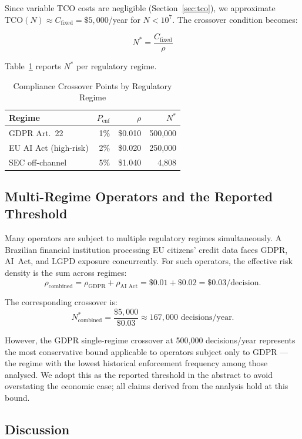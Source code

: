 Since variable TCO costs are negligible (Section~\ref{sec:tco}), we
approximate $\text{TCO}(N) \approx C_{\text{fixed}} = \$5{,}000$/year
for $N < 10^7$. The crossover condition becomes:

\[
  N^* = \frac{C_{\text{fixed}}}{\rho}
\]

Table~\ref{tab:crossover} reports $N^*$ per regulatory regime.

\begin{table}[h]
\centering
\caption{Compliance Crossover Points by Regulatory Regime}
\label{tab:crossover}
\begin{tabular}{lrrr}
\toprule
\textbf{Regime} & $P_{\text{enf}}$ & $\rho$ & $N^*$ \\
\midrule
GDPR Art.~22           & 1\%  & \$0.010  & 500{,}000 \\
EU AI Act (high-risk)  & 2\%  & \$0.020  & 250{,}000 \\
SEC off-channel        & 5\%  & \$1.040  & 4{,}808   \\
\bottomrule
\end{tabular}
\end{table}

\subsection{Multi-Regime Operators and the Reported Threshold}
\label{subsec:multiregime}

Many operators are subject to multiple regulatory regimes
simultaneously. A Brazilian financial institution processing EU
citizens' credit data faces GDPR, AI~Act, and LGPD exposure
concurrently. For such operators, the effective risk density is the
sum across regimes:
\[
  \rho_{\text{combined}} = \rho_{\text{GDPR}} + \rho_{\text{AI Act}}
  = \$0.01 + \$0.02 = \$0.03\text{/decision}.
\]

The corresponding crossover is:
\[
  N^*_{\text{combined}} = \frac{\$5{,}000}{\$0.03} \approx 167{,}000
  \text{ decisions/year.}
\]

However, the GDPR single-regime crossover at 500{,}000 decisions/year
represents the most conservative bound applicable to operators subject
only to GDPR --- the regime with the lowest historical enforcement
frequency among those analysed. We adopt this as the reported threshold
in the abstract to avoid overstating the economic case; all claims
derived from the analysis hold at this bound.

\subsection{Discussion}
\label{subsec:crossover-discussion}

